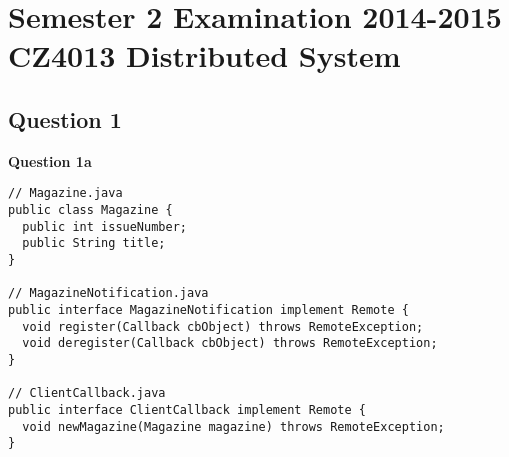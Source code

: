 \documentclass[11pt,a4paper]{report}
\begin{document}
\chapter{Semester 2 Examination 2014-2015\\CZ4013 Distributed System}

\section{Question 1}

\noindent \textbf{Question 1a}
\begin{verbatim}
// Magazine.java
public class Magazine {
  public int issueNumber;
  public String title;
}

// MagazineNotification.java
public interface MagazineNotification implement Remote {
  void register(Callback cbObject) throws RemoteException;
  void deregister(Callback cbObject) throws RemoteException;
}

// ClientCallback.java
public interface ClientCallback implement Remote {
  void newMagazine(Magazine magazine) throws RemoteException;
}
\end{verbatim}
\end{document}
